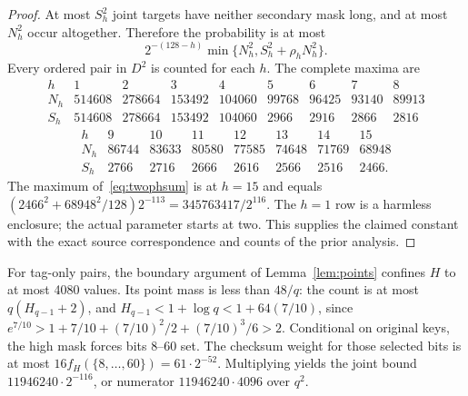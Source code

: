 \begin{proof}
At most $S_h^2$ joint targets have neither secondary mask long, and at most $N_h^2$ occur altogether. Therefore the probability is at most
\begin{equation}\label{eq:twophsum}
 2^{-(128-h)}\min\{N_h^2,S_h^2+\rho_hN_h^2\}.
\end{equation}
Every ordered pair in $D^2$ is counted for each $h$. The complete maxima are
\[
\begin{array}{c|rrrrrrrr}
h&1&2&3&4&5&6&7&8\\\hline
N_h&514608&278664&153492&104060&99768&96425&93140&89913\\
S_h&514608&278664&153492&104060&2966&2916&2866&2816
\end{array}
\]
\[
\begin{array}{c|rrrrrrr}
h&9&10&11&12&13&14&15\\\hline
N_h&86744&83633&80580&77585&74648&71769&68948\\
S_h&2766&2716&2666&2616&2566&2516&2466.
\end{array}
\]
The maximum of~\eqref{eq:twophsum} is at $h=15$ and equals
$(2466^2+68948^2/128)2^{-113}=345763417/2^{116}$. The $h=1$ row is a harmless enclosure; the actual parameter starts at two. This supplies the claimed constant with the exact source correspondence and counts of the prior analysis\cite{jointprior}.
\end{proof}

For tag-only pairs, the boundary argument of Lemma~\ref{lem:points} confines $H$ to at most 4080 values. Its point mass is less than $48/q$: the count is at most $q(H_{q-1}+2)$, and $H_{q-1}<1+\log q<1+64(7/10)$, since $e^{7/10}>1+7/10+(7/10)^2/2+(7/10)^3/6>2$. Conditional on original keys, the high mask forces bits 8--60 set. The checksum weight for those selected bits is at most $16f_H(\{8,\ldots,60\})=61\cdot2^{-52}$. Multiplying yields the joint bound $11946240\cdot2^{-116}$, or numerator $11946240\cdot4096$ over $q^2$.

